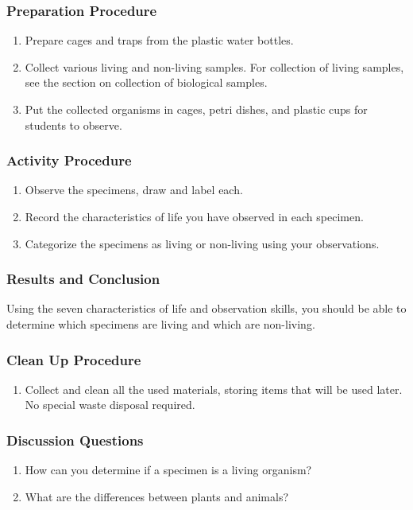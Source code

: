 \subsubsection*{Preparation Procedure}
\begin{enumerate}
\item{Prepare cages and traps from the plastic water bottles.}
\item{Collect various living and non-living samples. For collection of living samples, see the section on collection of biological samples.}
\item{Put the collected organisms in cages, petri dishes, and plastic cups for students to observe.}
\end{enumerate}

\subsubsection*{Activity Procedure}
\begin{enumerate}
\item{Observe the specimens, draw and label each.}
\item{Record the characteristics of life you have observed in each specimen.}
\item{Categorize the specimens as living or non-living using your observations.}
\end{enumerate}

\subsubsection*{Results and Conclusion}
Using the seven characteristics of life and observation skills, you should be able to determine which specimens are living and which are non-living. 

\subsubsection*{Clean Up Procedure}
\begin{enumerate}
\item{Collect and clean all the used materials, storing items that will be used later. No special waste disposal required.}
\end{enumerate}

\subsubsection*{Discussion Questions}
\begin{enumerate}
\item{How can you determine if a specimen is a living organism?}
\item{What are the differences between plants and animals?}
\end{enumerate}

